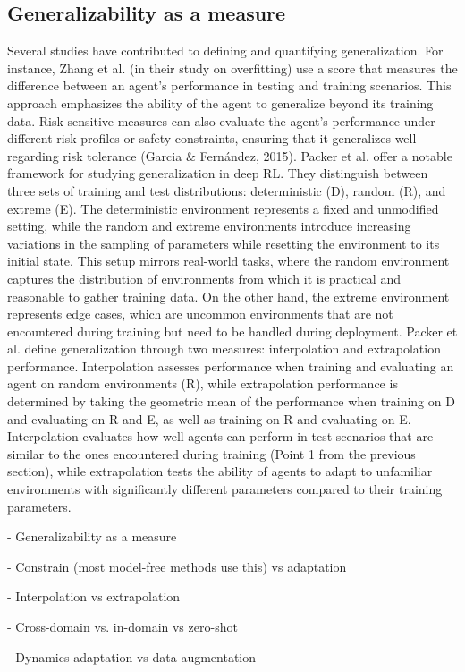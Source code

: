    

\subsection{Generalizability as a measure}


Several studies have contributed to defining and quantifying generalization. For instance, Zhang et al. (in their study on overfitting) use a score that measures the difference between an agent's performance in testing and training scenarios. This approach emphasizes the ability of the agent to generalize beyond its training data. Risk-sensitive measures can also evaluate the agent’s performance under different risk profiles or safety constraints, ensuring that it generalizes well regarding risk tolerance (Garcia \& Fernández, 2015). Packer et al. offer a notable framework for studying generalization in deep RL. They distinguish between three sets of training and test distributions: deterministic (D), random (R), and extreme (E). The deterministic environment represents a fixed and unmodified setting, while the random and extreme environments introduce increasing variations in the sampling of parameters while resetting the environment to its initial state. This setup mirrors real-world tasks, where the random environment captures the distribution of environments from which it is practical and reasonable to gather training data. On the other hand, the extreme environment represents edge cases, which are uncommon environments that are not encountered during training but need to be handled during deployment. Packer et al. define generalization through two measures: interpolation and extrapolation performance. Interpolation assesses performance when training and evaluating an agent on random environments (R), while extrapolation performance is determined by taking the geometric mean of the performance when training on D and evaluating on R and E, as well as training on R and evaluating on E. Interpolation evaluates how well agents can perform in test scenarios that are similar to the ones encountered during training (Point 1 from the previous section), while extrapolation tests the ability of agents to adapt to unfamiliar environments with significantly different parameters compared to their training parameters.




- Generalizability as a measure

- Constrain (most model-free methods use this) vs adaptation

- Interpolation vs extrapolation

- Cross-domain vs. in-domain vs zero-shot

- Dynamics adaptation vs data augmentation